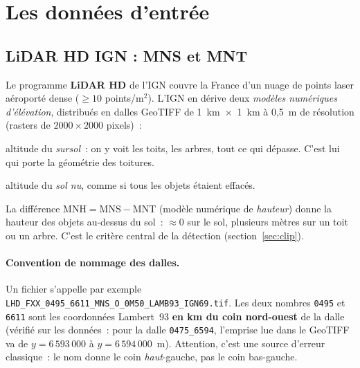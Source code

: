 \documentclass[11pt,a4paper]{article}
\newcommand{\fichier}[1]{\texttt{#1}}
\begin{document}
\section{Les données d'entrée}

\subsection{LiDAR HD IGN : MNS et MNT}
\label{sec:lidar}

Le programme \textbf{LiDAR HD} de l'IGN couvre la France d'un nuage de points
laser aéroporté dense ($\geq 10$ points/m$^2$). L'IGN en dérive deux
\emph{modèles numériques d'élévation}, distribués en dalles GeoTIFF de
1~km~$\times$~1~km à 0,5~m de résolution (rasters de $2000 \times 2000$
pixels)~:

\begin{description}[style=nextline]
  \item[MNS (Modèle Numérique de Surface)] altitude du \emph{sursol}~: on y voit
    les toits, les arbres, tout ce qui dépasse. C'est lui qui porte la géométrie
    des toitures.
  \item[MNT (Modèle Numérique de Terrain)] altitude du \emph{sol nu}, comme si
    tous les objets étaient effacés.
\end{description}

La différence $\text{MNH} = \text{MNS} - \text{MNT}$ (modèle numérique de
\emph{hauteur}) donne la hauteur des objets au-dessus du sol~: $\approx 0$ sur
le sol, plusieurs mètres sur un toit ou un arbre. C'est le critère central de la
détection (section~\ref{sec:clip}).

\paragraph{Convention de nommage des dalles.} Un fichier s'appelle par exemple
\fichier{LHD\_FXX\_0495\_6611\_}\allowbreak\fichier{MNS\_O\_0M50\_}\allowbreak\fichier{LAMB93\_IGN69.tif}. Les deux nombres
\fichier{0495} et \fichier{6611} sont les coordonnées Lambert~93 \textbf{en km du
coin nord-ouest} de la dalle (vérifié sur les données~: pour la dalle
\fichier{0475\_6594}, l'emprise lue dans le GeoTIFF va de $y = 6\,593\,000$ à
$y = 6\,594\,000$~m). Attention, c'est une source d'erreur classique~: le nom
donne le coin \emph{haut}-gauche, pas le coin bas-gauche.
\end{document}

